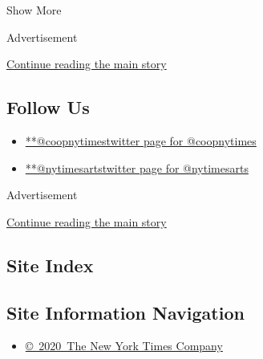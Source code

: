 Show More

Advertisement

\protect\hyperlink{after-mid2}{Continue reading the main story}

\hypertarget{follow-us}{%
\subsection{Follow Us}\label{follow-us}}

\begin{itemize}
\tightlist
\item
  \href{https://twitter.com/coopnytimes}{**@coopnytimestwitter page for
  @coopnytimes}
\item
  \href{https://twitter.com/nytimesarts}{**@nytimesartstwitter page for
  @nytimesarts}
\end{itemize}

Advertisement

\protect\hyperlink{after-mktg}{Continue reading the main story}

\hypertarget{site-index}{%
\subsection{Site Index}\label{site-index}}

\hypertarget{site-information-navigation}{%
\subsection{Site Information
Navigation}\label{site-information-navigation}}

\begin{itemize}
\tightlist
\item
  \href{https://help.nytimes3xbfgragh.onion/hc/en-us/articles/115014792127-Copyright-notice}{©~2020~The
  New York Times Company}
\end{itemize}

